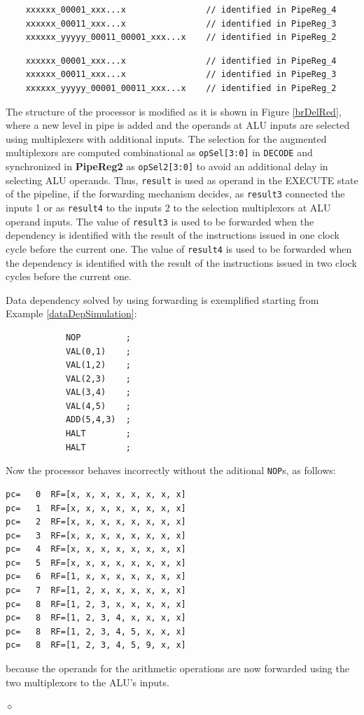 \begin{verbatim}
    xxxxxx_00001_xxx...x                // identified in PipeReg_4
    xxxxxx_00011_xxx...x                // identified in PipeReg_3
    xxxxxx_yyyyy_00011_00001_xxx...x    // identified in PipeReg_2
\end{verbatim}

\begin{verbatim}
    xxxxxx_00001_xxx...x                // identified in PipeReg_4
    xxxxxx_00011_xxx...x                // identified in PipeReg_3
    xxxxxx_yyyyy_00001_00011_xxx...x    // identified in PipeReg_2
\end{verbatim}



The structure of the processor is modified as it is shown in Figure \ref{brDelRed}, where a new level in pipe is added and the operands at  ALU inputs are selected using multiplexers with additional inputs. The selection for the augmented multiplexors are computed combinational as {\tt opSel[3:0]} in {\tt DECODE} and synchronized in {\bf PipeReg2} as {\tt opSel2[3:0]} to avoid an additional delay in selecting ALU operands. Thus, {\tt result} is used as operand in the EXECUTE state of the pipeline, if the forwarding mechanism decides, as {\tt result3} connected the  inputs 1  or as {\tt result4} to the inputs 2 to the selection multiplexors at ALU operand inputs. The value of {\tt result3} is used to be forwarded when the dependency is identified with the result of the instructions issued in one clock cycle before the current one. The value of {\tt result4} is used to be forwarded when the dependency is identified with the result of the instructions issued in two clock cycles before the current one.

\begin{exemplu}\label{dataDepSimulation}
Data dependency  solved by using forwarding is exemplified starting from Example \ref{dataDepSimulation}:
\begin{verbatim}
            NOP         ;
            VAL(0,1)    ;
            VAL(1,2)    ;
            VAL(2,3)    ;
            VAL(3,4)    ;
            VAL(4,5)    ;
            ADD(5,4,3)  ;
            HALT        ;
            HALT        ;
\end{verbatim}
Now the processor behaves incorrectly without the aditional {\tt NOP}s, as follows:
\begin{verbatim}
pc=   0  RF=[x, x, x, x, x, x, x, x]
pc=   1  RF=[x, x, x, x, x, x, x, x]
pc=   2  RF=[x, x, x, x, x, x, x, x]
pc=   3  RF=[x, x, x, x, x, x, x, x]
pc=   4  RF=[x, x, x, x, x, x, x, x]
pc=   5  RF=[x, x, x, x, x, x, x, x]
pc=   6  RF=[1, x, x, x, x, x, x, x]
pc=   7  RF=[1, 2, x, x, x, x, x, x]
pc=   8  RF=[1, 2, 3, x, x, x, x, x]
pc=   8  RF=[1, 2, 3, 4, x, x, x, x]
pc=   8  RF=[1, 2, 3, 4, 5, x, x, x]
pc=   8  RF=[1, 2, 3, 4, 5, 9, x, x]
\end{verbatim}
because the operands for the arithmetic operations are now forwarded  using the two multiplexors to the ALU's inputs.

$\diamond$
\end{exemplu}


